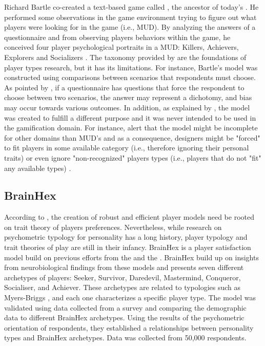 Richard Bartle co-created a text-based game called , the ancestor of today's . 
He performed some observations in the game environment trying to figure out what players were looking for in the game (i.e., MUD). 
By analyzing the answers of a questionnaire and from observing players behaviors within the game, he conceived four player psychological portraits in a MUD: Killers, Achievers, Explorers and Socializers \cite{Bartle1996}. 
The taxonomy provided by \citeauthor{Bartle1996} are the foundations of player types research, but it has its limitations. 
For instance, Bartle's model was constructed using comparisons between scenarios that respondents must choose. 
As pointed by \citeauthor{yee2006motivations}, if a questionnaire has questions that force the respondent to choose between two scenarios, the answer may represent a dichotomy, and bias may occur towards various outcomes.
In addition, as explained by \citeauthor{Bartle2009}, the model was created to fulfill a different purpose and it was never intended to be used in the gamification domain.
For instance, \citeauthor{youtube_bartle} alert that the model might be incomplete for other domains than MUD's and as a consequence, designers might be "forced" to fit players in some available category  (i.e., therefore ignoring their personal traits) or even ignore "non-recognized" players types (i.e., players that do not "fit" any available types) \cite{Bartle2009}.


\subsection{BrainHex}
\label{sec:BrainHex}

According to \cite{bateman2011player}, the creation of robust and efficient player models need be rooted on trait theory of players preferences. 
Nevertheless, while research on psychometric typology for personality has a long history, player typology and trait theories of play are still in their infancy. 
BrainHex is a player satisfaction model build on previous efforts from the   and the  \cite{Nacke2014}. 
BrainHex build up on insights from neurobiological findings from these models and presents seven different archetypes of players: Seeker, Survivor, Daredevil, Mastermind, Conqueror, Socialiser, and Achiever. These archetypes are related to typologies such as Myers-Briggs \cite{myers1985manual}, and each one characterizes a specific player type.
The model was validated using data collected from a survey and comparing the demographic data to different BrainHex archetypes. Using the results of the psychometric orientation of respondents, they established a relationships between personality types and BrainHex archetypes. Data was collected from 50,000 respondents.


